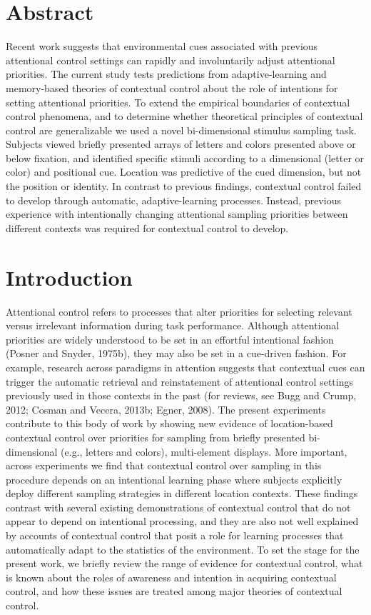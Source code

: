 \documentclass[]{DissertateCUNY}
\begin{document}
\hypertarget{abstract}{%
\section{Abstract}\label{abstract}}

Recent work suggests that environmental cues associated with previous
attentional control settings can rapidly and involuntarily adjust
attentional priorities. The current study tests predictions from
adaptive-learning and memory-based theories of contextual control about
the role of intentions for setting attentional priorities. To extend the
empirical boundaries of contextual control phenomena, and to determine
whether theoretical principles of contextual control are generalizable
we used a novel bi-dimensional stimulus sampling task. Subjects viewed
briefly presented arrays of letters and colors presented above or below
fixation, and identified specific stimuli according to a dimensional
(letter or color) and positional cue. Location was predictive of the
cued dimension, but not the position or identity. In contrast to
previous findings, contextual control failed to develop through
automatic, adaptive-learning processes. Instead, previous experience
with intentionally changing attentional sampling priorities between
different contexts was required for contextual control to develop.

\hypertarget{introduction}{%
\section{Introduction}\label{introduction}}

Attentional control refers to processes that alter priorities for
selecting relevant versus irrelevant information during task
performance. Although attentional priorities are widely understood to be
set in an effortful intentional fashion (Posner and Snyder, 1975b), they
may also be set in a cue-driven fashion. For example, research across
paradigms in attention suggests that contextual cues can trigger the
automatic retrieval and reinstatement of attentional control settings
previously used in those contexts in the past (for reviews, see Bugg and
Crump, 2012; Cosman and Vecera, 2013b; Egner, 2008). The present
experiments contribute to this body of work by showing new evidence of
location-based contextual control over priorities for sampling from
briefly presented bi-dimensional (e.g., letters and colors),
multi-element displays. More important, across experiments we find that
contextual control over sampling in this procedure depends on an
intentional learning phase where subjects explicitly deploy different
sampling strategies in different location contexts. These findings
contrast with several existing demonstrations of contextual control that
do not appear to depend on intentional processing, and they are also not
well explained by accounts of contextual control that posit a role for
learning processes that automatically adapt to the statistics of the
environment. To set the stage for the present work, we briefly review
the range of evidence for contextual control, what is known about the
roles of awareness and intention in acquiring contextual control, and
how these issues are treated among major theories of contextual control.
\end{document}

